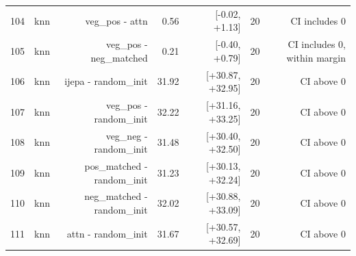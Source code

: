 \begin{table}[t]
\begin{tabular}{lrrrrrr}
104 & knn & veg\_pos - attn & 0.56 & [-0.02, +1.13] & 20 & CI includes 0 \\
105 & knn & veg\_pos - neg\_matched & 0.21 & [-0.40, +0.79] & 20 & CI includes 0, within margin \\
106 & knn & ijepa - random\_init & 31.92 & [+30.87, +32.95] & 20 & CI above 0 \\
107 & knn & veg\_pos - random\_init & 32.22 & [+31.16, +33.25] & 20 & CI above 0 \\
108 & knn & veg\_neg - random\_init & 31.48 & [+30.40, +32.50] & 20 & CI above 0 \\
109 & knn & pos\_matched - random\_init & 31.23 & [+30.13, +32.24] & 20 & CI above 0 \\
110 & knn & neg\_matched - random\_init & 32.02 & [+30.88, +33.09] & 20 & CI above 0 \\
111 & knn & attn - random\_init & 31.67 & [+30.57, +32.69] & 20 & CI above 0 \\
\bottomrule
\end{tabular}
\end{table}
